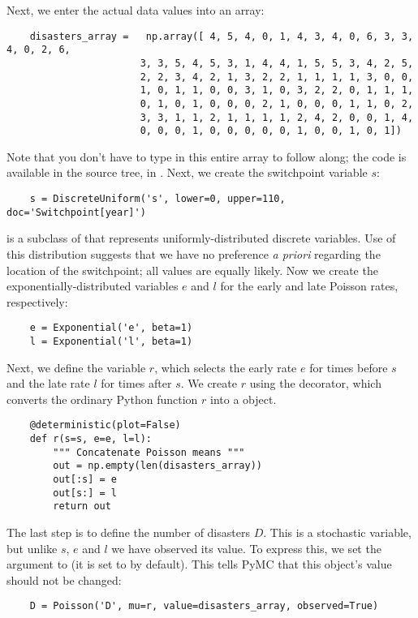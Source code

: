 Next, we enter the actual data values into an array:
\begin{verbatim}
	disasters_array =   np.array([ 4, 5, 4, 0, 1, 4, 3, 4, 0, 6, 3, 3, 4, 0, 2, 6,
	                   3, 3, 5, 4, 5, 3, 1, 4, 4, 1, 5, 5, 3, 4, 2, 5,
	                   2, 2, 3, 4, 2, 1, 3, 2, 2, 1, 1, 1, 1, 3, 0, 0,
	                   1, 0, 1, 1, 0, 0, 3, 1, 0, 3, 2, 2, 0, 1, 1, 1,
	                   0, 1, 0, 1, 0, 0, 0, 2, 1, 0, 0, 0, 1, 1, 0, 2,
	                   3, 3, 1, 1, 2, 1, 1, 1, 1, 2, 4, 2, 0, 0, 1, 4,
	                   0, 0, 0, 1, 0, 0, 0, 0, 0, 1, 0, 0, 1, 0, 1])
\end{verbatim}
Note that you don't have to type in this entire array to follow along; the code is available in the source tree, in .  Next, we create the switchpoint variable $s$:
\begin{verbatim}
	s = DiscreteUniform('s', lower=0, upper=110, doc='Switchpoint[year]')
\end{verbatim}
 is a subclass of  that represents uniformly-distributed discrete variables. Use of this distribution suggests that we have no preference \emph{a priori} regarding the location of the switchpoint; all values are equally likely. Now we create the exponentially-distributed variables $e$ and $l$ for the early and late Poisson rates, respectively:
\begin{verbatim}
	e = Exponential('e', beta=1)
	l = Exponential('l', beta=1)
\end{verbatim}
Next, we define the variable $r$, which selects the early rate $e$ for times before $s$ and the late rate $l$ for times after $s$. We create $r$ using the  decorator, which converts the ordinary Python function $r$ into a  object.
\begin{verbatim}
	@deterministic(plot=False)
	def r(s=s, e=e, l=l):
		""" Concatenate Poisson means """
	    out = np.empty(len(disasters_array))
	    out[:s] = e
	    out[s:] = l
	    return out
\end{verbatim}
The last step is to define the number of disasters $D$. This is a stochastic variable, but unlike $s$, $e$ and $l$ we have observed its value. To express this, we set the argument  to  (it is set to  by default). This tells PyMC that this object's value should not be changed:
\begin{verbatim}
	D = Poisson('D', mu=r, value=disasters_array, observed=True)
\end{verbatim}

